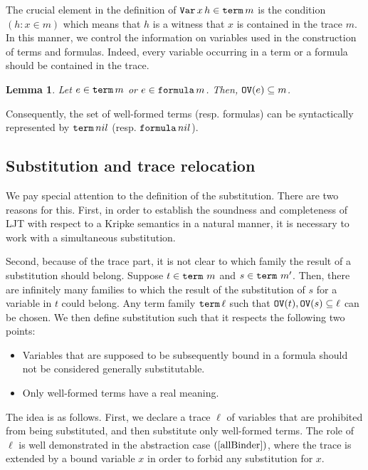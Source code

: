 \documentclass{kms-j}
\theoremstyle{plain}
\newtheorem{lem}[thm]{Lemma}
\theoremstyle{remark}
\begin{document}
The crucial element in the definition of $\textup{\tt Var}\, x\, h \in \textup{\tt term}\, m$ is the condition $(h : x \in m)$
which means that $h$ is a witness that $x$ is contained in the trace $m$.
In this manner, we control the information on variables used in the
construction of  terms and formulas.
Indeed, every variable occurring in a term or a formula should be contained in the trace.

\begin{lem}\label{ph-property}
  Let $e \in \textup{\tt term}\, m$ or $e \in \textup{\tt formula}\, m$. Then, $\textup{\tt OV}(e) \subseteq m$.
\end{lem}
%
Consequently, the set of well-formed terms (resp. formulas) can be syntactically
represented by $\textup{\tt term}\, nil$ (resp. $\textup{\tt formula}\, nil$).

\subsection{Substitution and trace relocation}

We pay special attention to the definition of the substitution.
There are two reasons for this.
First, in order to establish the soundness and completeness of LJT
with respect to a Kripke semantics in a natural manner,
it is necessary to work with a simultaneous substitution. %

Second, because of the trace part, it is not clear to which family the result of a substitution
should belong.
Suppose $t \in \textup{\tt term}\,\, m$ and $s \in \textup{\tt term}\,\, m'$.
Then, there are infinitely many families to which the result of the substitution of $s$ for a
variable in $t$ could belong.
Any term family $\textup{\tt term}\, \ell$ such that $\textup{\tt OV}(t), \textup{\tt OV}(s) \subseteq \ell$ can be chosen.
We then define substitution such that it respects the following two points:
\begin{itemize}
\item Variables that are supposed to be subsequently bound in a formula should not be considered
	generally substitutable.

\item Only well-formed terms have a real meaning.
\end{itemize}

The idea is as follows. First, we declare a trace $\ell$ of variables
that are prohibited from being substituted,
and then substitute only well-formed terms.
The role of $\ell$ is well demonstrated in the abstraction case $(\ref{allBinder})$,
where the trace is extended by a bound variable $x$ in order to forbid any substitution for $x$.
\end{document}

